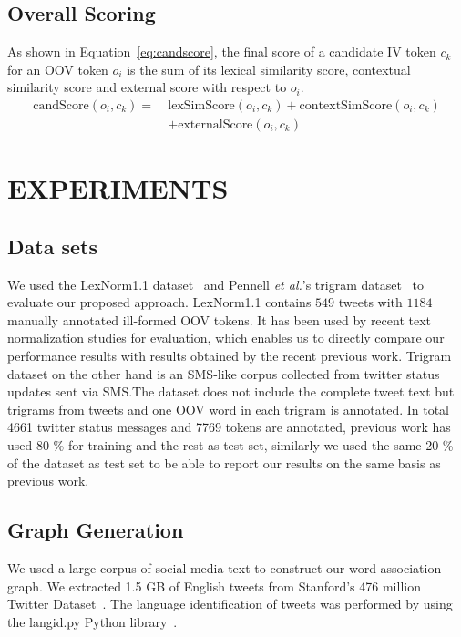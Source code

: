 \documentclass[a4paper,onesided,12pt]{report}
\begin{document}
\section{Overall Scoring}

As shown in Equation~\ref{eq:candscore}, the final score of a candidate IV token $c_k$ for an OOV token $o_i$ is the sum of its lexical similarity score, contextual similarity score and external score with respect to $o_i$.
\begin{equation}
\begin{aligned}
\text{candScore}(o_i,c_k) = ~ & \text{lexSimScore}(o_i,c_k) + \text{contextSimScore}(o_i,c_k) \\
& + \text{externalScore}(o_i,c_k)
\end{aligned}
\label{eq:candscore}
\end{equation}

\chapter{EXPERIMENTS}
\label{sec:experiments}

\section{Data sets}
\label{sec:datasets}
We used the LexNorm1.1 dataset~\cite{Han:2011:LNS:2002472.2002520} and Pennell \textit{et al.}'s trigram dataset~\cite{pennell2011character,Pennell2014256} to evaluate our proposed approach. LexNorm1.1 contains $549$ tweets with $1184$ manually annotated ill-formed OOV tokens. It has been used by recent text normalization studies for evaluation, which enables us to directly compare our performance results with results obtained by the recent previous work. Trigram dataset on the other hand is an SMS-like corpus collected from twitter status updates sent via SMS.\@ The dataset does not include the complete tweet text but trigrams from tweets and one OOV word in each trigram is annotated. In total 4661 twitter status messages and 7769 tokens are annotated, previous work has used 80 \% for training and the rest as test set, similarly we used the same 20 \% of the dataset as test set to be able to report our results on the same basis as previous work.

\section{Graph Generation}
We used a large corpus of social media text to construct our word association graph. We extracted 1.5 GB of English tweets from Stanford's 476 million Twitter Dataset~\cite{DBLP:conf/wsdm/YangL11}. The language identification of tweets was performed by using the langid.py Python library~\cite{Lui:2012:LOL:2390470.2390475, Baldwin:2010:LIL:1857999.1858026}.
\end{document}
